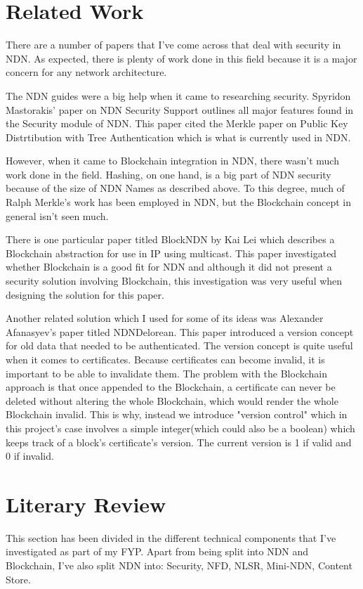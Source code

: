 \section{Related Work}
There are a number of papers that I've come across that deal with security in NDN. As expected, there is plenty of work done in this field because it is a major concern for any network architecture.\par 

The NDN guides were a big help when it came to researching security. Spyridon Mastorakis' paper on NDN Security Support outlines all major features found in the Security module of NDN. This paper cited the Merkle paper on Public Key Distrtibution with Tree Authentication which is what is currently used in NDN.\par



However, when it came to Blockchain integration in NDN, there wasn't much work done in the field. Hashing, on one hand, is a big part of NDN security because of the size of NDN Names as described above. To this degree, much of Ralph Merkle's work has been employed in NDN, but the Blockchain concept in general isn't seen much. 

There is one particular paper titled BlockNDN by Kai Lei which describes a Blockchain abstraction for use in IP using multicast. This paper investigated whether Blockchain is a good fit for NDN and although it did not present a security solution involving Blockchain, this investigation was very useful when designing the solution for this paper.\par

Another related solution which I used for some of its ideas was Alexander Afanasyev's paper titled NDNDelorean. This paper introduced a version concept for old data that needed to be authenticated. The version concept is quite useful when it comes to certificates. Because certificates can become invalid, it is important to be able to invalidate them. The problem with the Blockchain approach is that once appended to the Blockchain, a certificate can never be deleted without altering the whole Blockchain, which would render the whole Blockchain invalid. This is why, instead we introduce "version control" which in this project's case involves a simple integer(which could also be a boolean) which keeps track of a block's certificate's version. The current version is 1 if valid and 0 if invalid.
\section{Literary Review}
This section has been divided in the different technical components that I've investigated as part of my FYP. Apart from being split into NDN and Blockchain, I've also split NDN into: Security, NFD, NLSR, Mini-NDN, Content Store.

